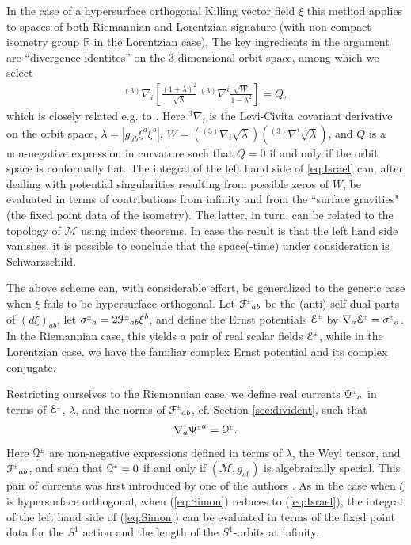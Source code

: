 \documentclass[a4paper,11pt,reqno]{amsart}
\newcommand{\cM}{\mathcal{M}}
\theoremstyle{plain}
\newcommand{\PM}[1]{{{#1}^{\hspace{-.5pt}\scaleto{\pm}{3.5pt}}}}
\def\Fcal{\mathcal{F}}
\def\Ecal{\mathcal{E}}
\def\Qcal{\mathcal{Q}}
\numberwithin{equation}{section}
\begin{document}
In the case of a  hypersurface orthogonal Killing vector field $\xi$ this method applies to spaces of both Riemannian and Lorentzian signature (with non-compact isometry group $\mathbb{R}$ in the Lorentzian case).  The key ingredients in the argument are ``divergence identites'' on the 3-dimensional orbit space, among which we select
\begin{align}
 \label{eq:Israel} %
  {}^{(3)}\nabla_i \left[ \frac{(1 + \lambda)^2}{\sqrt{\lambda}} \, {}^{(3)}\nabla^i \frac{\sqrt{W}}{1 - \lambda^2}\right] = Q,    \end{align} 
  which is closely related e.g. to \cite[Eqs. (2.12)-(2.13)]{MR398432}. Here ${}^3\nabla_i$ is the Levi-Civita covariant derivative on the orbit space, $\lambda  = |g_{ab}\xi^a \xi^b|$,  $W = ({}^{(3)}\nabla_i  \sqrt{\lambda})({}^{(3)} \nabla^i \sqrt{\lambda})$, and $Q$ is  a non-negative expression in curvature 
such that $Q = 0$ if and only if the orbit space is conformally flat.  
The integral of the left hand side of \eqref{eq:Israel} can, after dealing with potential singularities resulting from possible  zeros of $W$, be evaluated in terms of contributions from infinity and from the ``surface gravities" (the fixed point data of the isometry). The latter, in turn, can be related to the topology of $\cM$ using index theorems. In case the result is that the left hand side vanishes, it is possible to conclude that the space(-time) under consideration is Schwarzschild.


The above scheme can, with considerable effort, be generalized to the generic case when $\xi$ fails to be hypersurface-orthogonal. Let $\PM{\Fcal}_{ab}$ be the (anti)-self dual parts of $(d\xi)_{ab}$, let $\PM{\sigma}_{a}= 2 \PM{\Fcal}_{ab} \xi^{b}$, and define the Ernst potentials $\PM{\Ecal}$ by $\nabla_a \PM{\Ecal} = \PM{\sigma}_a$. In the Riemannian case, this yields a pair of real scalar fields $\PM{\Ecal}$, while in the Lorentzian case, we have the familiar complex Ernst potential and its complex conjugate.  

Restricting ourselves to the  Riemannian case, we define real currents $\PM{\Psi}_a$ in terms of $\PM{\Ecal}$, $\lambda$, and the norms of $\PM{\Fcal}_{ab}$, cf. Section \ref{sec:divident}, such that  
\begin{align} \label{eq:Simon} 
\nabla_a \PM{\Psi}^a = \PM{\Qcal}. 
\end{align} 
Here $\PM{\Qcal}$ are non-negative expressions defined in terms of $\lambda$, the Weyl tensor, and $\PM{\Fcal}_{ab}$, and such that $\PM{\Qcal} = 0$ if and only if $(\cM, g_{ab})$ is algebraically special. This pair of currents  was first introduced by one of the authors \cite{simon:1995}.  
As in the case when $\xi$ is hypersurface orthogonal, when (\ref{eq:Simon}) reduces to (\ref{eq:Israel}),  the integral of the left hand side of  (\ref{eq:Simon}) can be evaluated in terms of the fixed point data for the $S^1$ action and the length of the $S^1$-orbits at infinity. 
\end{document}
